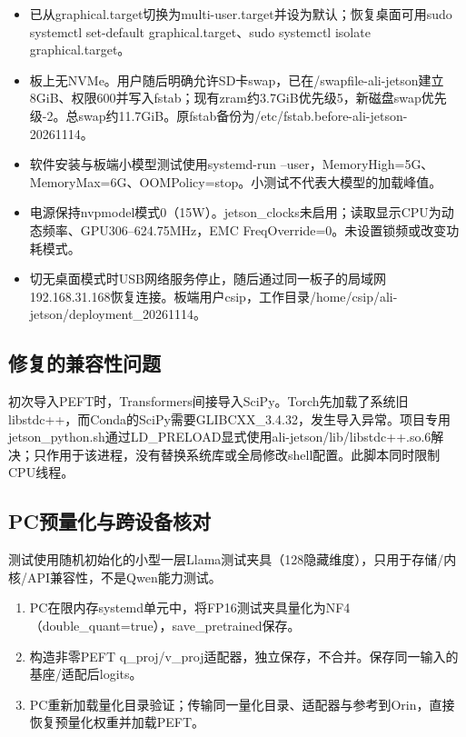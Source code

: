 \begin{itemize}
\tightlist
\item
  已从graphical.target切换为multi-user.target并设为默认；恢复桌面可用sudo systemctl set-default graphical.target、sudo systemctl isolate graphical.target。
\item
  板上无NVMe。用户随后明确允许SD卡swap，已在/swapfile-ali-jetson建立8GiB、权限600并写入fstab；现有zram约3.7GiB优先级5，新磁盘swap优先级-2。总swap约11.7GiB。原fstab备份为/etc/fstab.before-ali-jetson-20261114。
\item
  软件安装与板端小模型测试使用systemd-run --user，MemoryHigh=5G、MemoryMax=6G、OOMPolicy=stop。小测试不代表大模型的加载峰值。
\item
  电源保持nvpmodel模式0（15W）。jetson\_clocks未启用；读取显示CPU为动态频率、GPU306--624.75MHz，EMC FreqOverride=0。未设置锁频或改变功耗模式。
\item
  切无桌面模式时USB网络服务停止，随后通过同一板子的局域网192.168.31.168恢复连接。板端用户csip，工作目录/home/csip/ali-jetson/deployment\_20261114。
\end{itemize}

\subsection{修复的兼容性问题}\label{s21-detail-3}

初次导入PEFT时，Transformers间接导入SciPy。Torch先加载了系统旧libstdc++，而Conda的SciPy需要GLIBCXX\_3.4.32，发生导入异常。项目专用jetson\_python.sh通过LD\_PRELOAD显式使用ali-jetson/lib/libstdc++.so.6解决；只作用于该进程，没有替换系统库或全局修改shell配置。此脚本同时限制CPU线程。

\subsection{PC预量化与跨设备核对}\label{s21-detail-4}

测试使用随机初始化的小型一层Llama测试夹具（128隐藏维度），只用于存储/内核/API兼容性，不是Qwen能力测试。

\begin{enumerate}
\def\labelenumi{\arabic{enumi}.}
\tightlist
\item
  PC在限内存systemd单元中，将FP16测试夹具量化为NF4（double\_quant=true），save\_pretrained保存。
\item
  构造非零PEFT q\_proj/v\_proj适配器，独立保存，不合并。保存同一输入的基座/适配后logits。
\item
  PC重新加载量化目录验证；传输同一量化目录、适配器与参考到Orin，直接恢复预量化权重并加载PEFT。
\end{enumerate}

